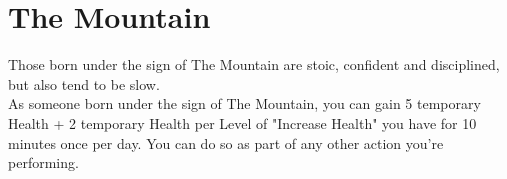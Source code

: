 \section{The Mountain}

Those born under the sign of The Mountain are stoic, confident and disciplined, but also tend to be slow.\\
As someone born under the sign of The Mountain, you can gain 5 temporary Health + 2 temporary Health per Level of "Increase Health" you have for 10 minutes once per day.
You can do so as part of any other action you're performing.\\
